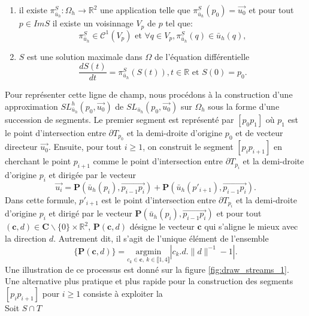\begin{enumerate}
\item il existe $\pi_{\bar{u}_h}^S:\Omega_h\longrightarrow\mathbb{R}^2$ une application telle que $\pi_{\bar{u}_h}^S(p_0)=\overrightarrow{u_0}$ et pour tout $p\in Im S$ il existe un voisinnage $V_p$ de $p$ tel que:
\begin{equation}
\pi_{\bar{u}_h}^S\in\mathcal{C}^1(V_p) \mbox{ et }  \forall q\in V_p, \pi_{\bar{u}_h}^S(q)\in \bar{u}_h(q),
\end{equation}
\item $S$ est une solution maximale dans $\Omega$ de l'équation différentielle
\begin{equation}
\frac{dS(t)}{dt}=\pi_{\bar{u}_h}^S(S(t)),t\in \mathbb{R} \text{ et }  S(0)=p_0.
\end{equation}
\end{enumerate}
Pour représenter cette ligne de champ, nous procédons à la construction d'une approximation $SL^h_{\bar{u}_h}(p_0, \overrightarrow{u_0})$ de $SL_{\bar{u}_h}(p_0, \overrightarrow{u_0})$ sur $\Omega_h$ sous la forme d'une succession de segments. Le premier segment est représenté par $[p_0p_1]$ où $p_1$ est le point d'intersection entre $\partial T_{p_0}$ et la demi-droite d'origine $p_0$ et de vecteur directeur $\overrightarrow{u_0}$. Ensuite, pour tout $i\geq 1$, on construit le segment  $[p_ip_{i+1}]$ en cherchant le point $p_{i+1}$ comme le point d'intersection entre $\partial T_{p_i}$ et la demi-droite d'origine $p_i$ et dirigée par le vecteur
$$
\overrightarrow{u_i}=\mathbf{P}(\bar{u}_h(p_i), \overrightarrow{p_{i-1}p_i})+\mathbf{P}(\bar{u}_h(p'_{i+1}), \overrightarrow{p_{i-1}p_i}).
$$
Dans cette formule, $p'_{i+1}$ est le point d'intersection entre $\partial T_{p_i}$ et la demi-droite d'origine $p_i$ et dirigé par le vecteur $\mathbf{P}(\bar{u}_h(p_i), \overrightarrow{p_{i-1}p_i})$ et pour tout $(\mathbf{c},d)\in\mathbf{C}\backslash\{0\}\times\mathbb{R}^2$, $\mathbf{P}(\mathbf{c}, d)$ désigne le vecteur $\mathbf{c}$ qui s'aligne le mieux avec la direction $d$. Autrement dit, il s'agit de l'unique élément de l'ensemble
$$
\{\mathbf{P}(\mathbf{c}, d)\}=\underset{c_k\in\mathbf{c},~k\in\llbracket1, 4\rrbracket}{\mathrm{argmin}}|c_k.d.\|d\|^{-1}-1|.
$$
Une illustration de ce processus est donné sur la figure \ref{fig:draw_streams_1}.  Une alternative plus pratique et plus rapide pour la construction des segments $[p_ip_{i+1}]$ pour $i\geq 1$ consiste à exploiter la\\
Soit $S\cap T$

